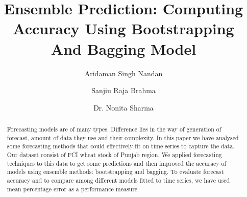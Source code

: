 \documentclass[runningheads]{llncs}
\begin{document}
\title{Ensemble Prediction: Computing Accuracy Using Bootstrapping And Bagging Model }
%
%
\author{Aridaman Singh Nandan \and
Sanjiu Raja Brahma\and
Dr. Nonita Sharma}

%
\maketitle              %
%
\begin{abstract}
Forecasting models are of many types. Difference lies in the way of generation of forecast, amount of data they use and their complexity. In this paper we have analysed some forecasting methods that could effectively fit on time series to capture the data. Our dataset consist of FCI wheat stock of Punjab region. We applied forecasting techniques to this data to get some predictions and then improved the accuracy of models using ensemble methods: bootstrapping and bagging. To evaluate forecast accuracy and to compare among different models fitted to time series, we have used mean percentage error as a performance measure.

\end{abstract}
%
%
%
\end{document}
